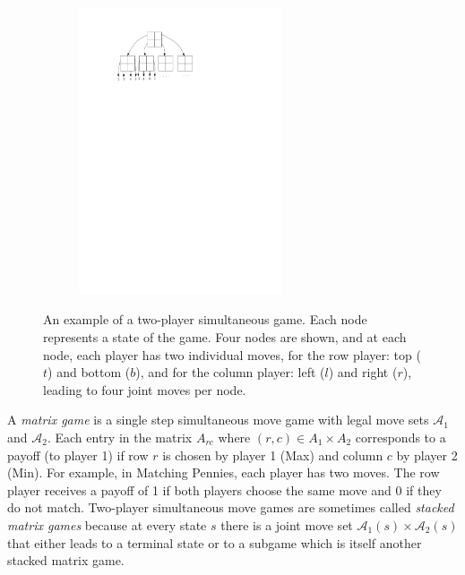 \documentclass[conference]{IEEEtran}
\newcommand{\cA}{\mathcal{A}}
\begin{document}
\begin{figure}[t!]
\centering
\begin{subfigure}{6cm}
\centering
\includegraphics[width=6.0cm]{figures/tree2}\\
\end{subfigure}
\caption{An example of a two-player simultaneous game. Each node represents a state of 
the game. Four nodes are shown, and at each node, each player has two individual moves, for the row player: top ($t$) and bottom ($b$), 
and for the column player: left ($l$) and right ($r$), leading to four joint moves per node.
\label{fig:example}}
\end{figure}

A {\it matrix game} is a single step simultaneous move game with legal move sets $\cA_1$ and $\cA_2$. 
Each entry in the matrix $A_{rc}$ where $(r,c) \in A_1 \times A_2$ corresponds to a payoff (to player 1) if row $r$ is chosen by 
player 1 (Max) and column $c$ by player 2 (Min). 
For example, in Matching Pennies, each player has two moves. The row player receives a payoff of 1 if both 
players choose the same move and 0 if they do not match. 
Two-player simultaneous move games are sometimes called {\it stacked matrix games} because at every state 
$s$ there is a joint move set $\cA_1(s) \times \cA_2(s)$ that either leads to a terminal state or to a subgame which 
is itself another stacked matrix game. 
\end{document}

